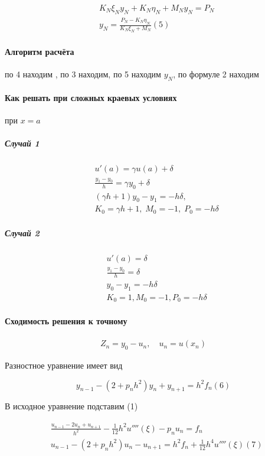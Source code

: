 \begin{align*}
&K_N \xi_N y_N + K_N \eta_N + M_N y_N = P_N\\
&y_N = \frac{P_N - K_N \eta_N}{K_N \xi_N + M_N} (5)
\end{align*}

\paragraph{Алгоритм расчёта}

по 4 находим , по 3 находим, по 5 находим $y_N$, по формуле 2 находим

\paragraph{Как решать при сложных краевых условиях}

при $x = a$
\subparagraph{Случай 1}
\begin{align*}
	&u'(a) = \gamma u(a) + \delta\\
	&\frac{y_1 - y_0}{h} = \gamma y_0 + \delta\\
	&(\gamma h + 1) y_0 - y_1 = -h\delta,\\
	&K_0 = \gamma h + 1,\; M_0 = -1,\; P_0 = - h\delta
\end{align*}

\subparagraph{Случай 2}
\begin{align*}
&u'(a) = \delta\\
&\frac{y_1 - y_0}{h} = \delta\\
&y_0 - y_1 = - h\delta\\
& K_0 = 1, M_0 = -1, P_0 = - h\delta
\end{align*}

\paragraph{Сходимость решения к точному}
\begin{align*}
Z_n = y_0 - u_n, \quad u_n = u(x_n)
\end{align*}

Разностное уравнение имеет вид

\[
	y_{n-1} - (2 + p_n h^2) y_n + y_{n+1} = h^2 f_n (6)
\]

В исходное уравнение подставим (1)

\begin{align*}
&\frac{u_{n-1} - 2u_n + u_{n+1}}{h^2} - \frac{1}{12}h^2 u''''(\xi) - p_n u_n = f_n\\
&u_{n-1} - (2+ p_nh^2)u_n - u_{n+1} = h^2f_n + \frac{1}{12} h^4 u''''(\xi) (7)
\end{align*}

